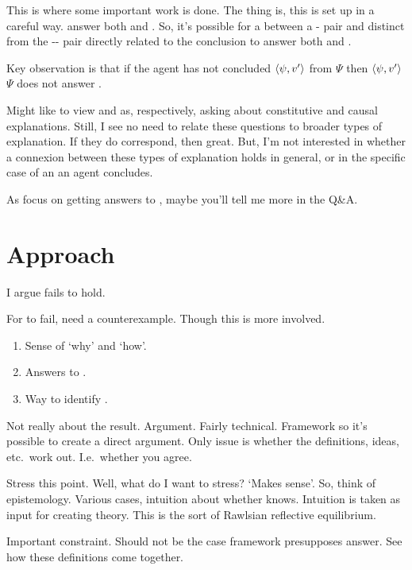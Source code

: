 \documentclass[10pt]{article}
\begin{document}
\begin{note}
  This is where some important work is done.
  The thing is, this is set up in a careful way.
   answer both \qWhy{} and \qHow{}.
  So, it's possible for a \fofr{} between a - pair and \pool{} distinct from the -- pair directly related to the conclusion to answer both \qWhy{} and \qHow{}.

  Key observation is that if the agent has not concluded \(\langle\psi, v'\rangle\) from \(\Psi\) then \(\langle\psi, v'\rangle\) \fof{} \(\Psi\) does not answer \qHow{}.
\end{note}


\begin{note}
  Might like to view \qWhy{} and \qHow{} as, respectively, asking about constitutive and causal explanations.
  Still, I see no need to relate these questions to broader types of explanation.
  If they do correspond, then great.
  But, I'm not interested in whether a connexion between these types of explanation holds in general, or in the specific case of an \eiw{} an agent concludes.

  As focus on getting answers to \qWhy{}, maybe you'll tell me more in the Q\&A.
\end{note}


\section{Approach}
\label{sec:approach}

\begin{note}
  I argue \issueInclusion{} fails to hold.
\end{note}


\begin{note}
  For \issueInclusion{} to fail, need a counterexample.
  Though this is more involved.

  \begin{enumerate}
  \item
    Sense of `why' and `how'.
  \item
    Answers to \qWhy{}.
  \item
    Way to identify \fingfr{}.
  \end{enumerate}
\end{note}

\begin{note}
  Not really about the result.
  Argument.
  Fairly technical.
  Framework so it's possible to create a direct argument.
  Only issue is whether the definitions, ideas, etc.\ work out.
  I.e.\ whether you agree.

  Stress this point.
  Well, what do I want to stress?
  `Makes sense'.
  So, think of epistemology.
  Various cases, intuition about whether knows.
  Intuition is taken as input for creating theory.
  This is the sort of Rawlsian reflective equilibrium.

  Important constraint.
  Should not be the case framework presupposes answer.
  See how these definitions come together.
  
\end{note}
\end{document}

